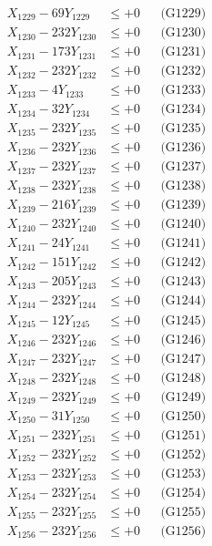 \documentclass[a4paper,10pt]{article}
\begin{document}
{\begin{align}
X_{1229} - 69Y_{1229} &\leq +0 && \text{(G1229)} \\
X_{1230} - 232Y_{1230} &\leq +0 && \text{(G1230)} \\
\allowbreak
X_{1231} - 173Y_{1231} &\leq +0 && \text{(G1231)} \\
X_{1232} - 232Y_{1232} &\leq +0 && \text{(G1232)} \\
X_{1233} - 4Y_{1233} &\leq +0 && \text{(G1233)} \\
X_{1234} - 32Y_{1234} &\leq +0 && \text{(G1234)} \\
X_{1235} - 232Y_{1235} &\leq +0 && \text{(G1235)} \\
X_{1236} - 232Y_{1236} &\leq +0 && \text{(G1236)} \\
X_{1237} - 232Y_{1237} &\leq +0 && \text{(G1237)} \\
X_{1238} - 232Y_{1238} &\leq +0 && \text{(G1238)} \\
X_{1239} - 216Y_{1239} &\leq +0 && \text{(G1239)} \\
X_{1240} - 232Y_{1240} &\leq +0 && \text{(G1240)} \\
\allowbreak
X_{1241} - 24Y_{1241} &\leq +0 && \text{(G1241)} \\
X_{1242} - 151Y_{1242} &\leq +0 && \text{(G1242)} \\
X_{1243} - 205Y_{1243} &\leq +0 && \text{(G1243)} \\
X_{1244} - 232Y_{1244} &\leq +0 && \text{(G1244)} \\
X_{1245} - 12Y_{1245} &\leq +0 && \text{(G1245)} \\
X_{1246} - 232Y_{1246} &\leq +0 && \text{(G1246)} \\
X_{1247} - 232Y_{1247} &\leq +0 && \text{(G1247)} \\
X_{1248} - 232Y_{1248} &\leq +0 && \text{(G1248)} \\
X_{1249} - 232Y_{1249} &\leq +0 && \text{(G1249)} \\
X_{1250} - 31Y_{1250} &\leq +0 && \text{(G1250)} \\
\allowbreak
X_{1251} - 232Y_{1251} &\leq +0 && \text{(G1251)} \\
X_{1252} - 232Y_{1252} &\leq +0 && \text{(G1252)} \\
X_{1253} - 232Y_{1253} &\leq +0 && \text{(G1253)} \\
X_{1254} - 232Y_{1254} &\leq +0 && \text{(G1254)} \\
X_{1255} - 232Y_{1255} &\leq +0 && \text{(G1255)} \\
X_{1256} - 232Y_{1256} &\leq +0 && \text{(G1256)} \\

\end{align}}
\end{document}
